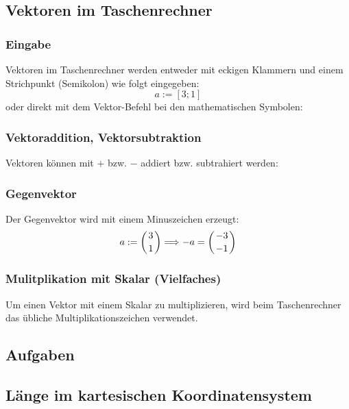 \subsection{Vektoren im Taschenrechner}

\subsubsection{Eingabe}
Vektoren im Taschenrechner werden entweder mit eckigen Klammern und
einem Strichpunkt (Semikolon) wie folgt eingegeben:
$$a := [3; 1]$$
oder direkt mit dem Vektor-Befehl bei den mathematischen Symbolen:


\subsubsection{Vektoraddition, Vektorsubtraktion}
Vektoren können mit $+$ bzw. $-$ addiert bzw. subtrahiert
werden:

\subsubsection{Gegenvektor}
Der Gegenvektor wird mit einem Minuszeichen erzeugt:
$$a:=\left(3\atop 1\right) \Longrightarrow -a = \left( -3 \atop
-1\right)$$
\newpage

\subsubsection{Mulitplikation mit Skalar (Vielfaches)}

Um einen Vektor mit einem Skalar zu multiplizieren, wird beim
Taschenrechner das übliche Multiplikationszeichen verwendet.


\subsection*{Aufgaben}
\newpage


\subsection{Länge im kartesischen Koordinatensystem}

